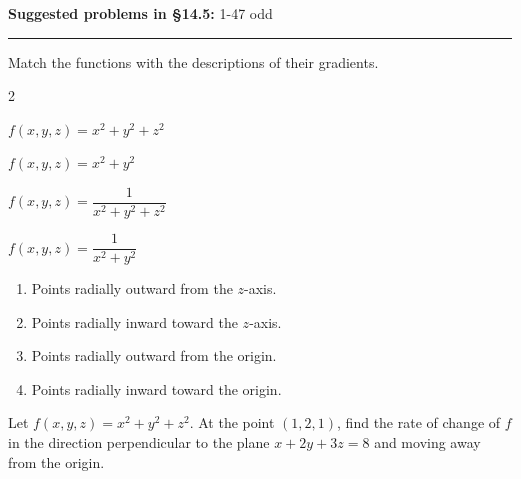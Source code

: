 \documentclass[12pt,reqno]{amsart}
\begin{document}
\textbf{Suggested problems in \S14.5:} 1-47 odd 

\medskip
\hrule

\bigskip

\prob Match the functions with the descriptions of their gradients.

\medskip
\begin{henumerate}{2}
\item $f(x,y,z) = x^2+y^2+z^2$
\item $f(x,y,z) = x^2+y^2$
\item $f(x,y,z) = \dfrac{1}{x^2+y^2+z^2}$
\item $f(x,y,z) = \dfrac{1}{x^2+y^2}$
\end{henumerate}

\bigskip
\begin{enumerate}
\item[(i)] Points radially outward from the $z$-axis.\medskip
\item[(ii)] Points radially inward toward the $z$-axis.\medskip
\item[(iii)] Points radially outward from the origin.\medskip
\item[(iv)] Points radially inward toward the origin.
\end{enumerate}

\vspace{1in}
\prob Let $f(x,y,z) = x^2+y^2+z^2$. At the point $(1,2,1)$, find the rate of change of $f$ in the direction perpendicular to the plane $x+2y+3z=8$ and moving away from the origin.


\vfill
\end{document}
